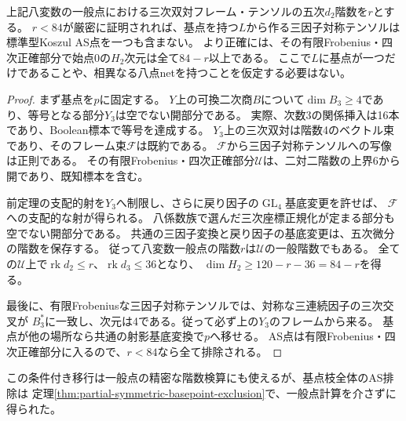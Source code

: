 \begin{proposition}[支配的チャートから全基点域への障害の移送]
\label{prop:product-net-universal-obstruction-transfer}
上記八変数の一般点における三次双対フレーム・テンソルの五次$d_2$階数を$r$とする。
$r<84$が厳密に証明されれば、基点を持つ$L$から作る三因子対称テンソルは
標準型Koszul AS点を一つも含まない。
より正確には、その有限Frobenius・四次正確部分で始点0の$H_2$次元は全て$84-r$以上である。
ここで$L$に基点が一つだけであることや、相異なる八点netを持つことを仮定する必要はない。
\end{proposition}
\begin{proof}
まず基点を$p$に固定する。
$Y$上の可換二次商$B$について$\dim B_3\geq4$であり、等号となる部分$Y_3$は空でない開部分である。
実際、次数3の関係挿入は16本であり、Boolean標本で等号を達成する。
$Y_3$上の三次双対は階数4のベクトル束であり、そのフレーム束$\mathcal F$は既約である。
$\mathcal F$から三因子対称テンソルへの写像は正則である。
その有限Frobenius・四次正確部分$\mathcal U$は、二対二階数の上界6から開であり、既知標本を含む。

前定理の支配的射を$Y_3$へ制限し、さらに戻り因子の$\operatorname{GL}_4$基底変更を許せば、
$\mathcal F$への支配的な射が得られる。
八係数族で選んだ三次座標正規化が定まる部分も空でない開部分である。
共通の三因子変換と戻り因子の基底変更は、五次微分の階数を保存する。
従って八変数一般点の階数$r$は$\mathcal U$の一般階数でもある。
全ての$\mathcal U$上で$\operatorname{rk}d_2\leq r$、$\operatorname{rk}d_3\leq36$となり、
$\dim H_2\geq120-r-36=84-r$を得る。

最後に、有限Frobeniusな三因子対称テンソルでは、対称な三連続因子の三次交叉が
$B_3^*$に一致し、次元は4である。従って必ず上の$Y_3$のフレームから来る。
基点が他の場所なら共通の射影基底変換で$p$へ移せる。
AS点は有限Frobenius・四次正確部分に入るので、$r<84$なら全て排除される。
\end{proof}

この条件付き移行は一般点の精密な階数検算にも使えるが、基点枝全体のAS排除は
定理\ref{thm:partial-symmetric-basepoint-exclusion}で、一般点計算を介さずに得られた。

